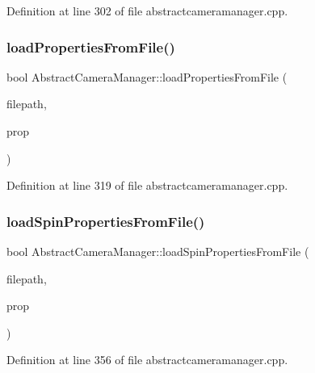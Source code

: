Definition at line 302 of file abstractcameramanager.\+cpp.

\mbox{\label{class_abstract_camera_manager_ae4c1fb8afd64ed6e843130ac9ccb90ce}} 
\subsubsection{\texorpdfstring{loadPropertiesFromFile()}{loadPropertiesFromFile()}}
{\footnotesize\ttfamily bool Abstract\+Camera\+Manager\+::load\+Properties\+From\+File (\begin{DoxyParamCaption}\item[{Q\+String \&}]{filepath,  }\item[{std\+::vector$<$ \mbox{\hyperlink{class_camera_manager_1_1_camera_property}{Camera\+Property}} $>$ \&}]{prop }\end{DoxyParamCaption})}



Definition at line 319 of file abstractcameramanager.\+cpp.

\mbox{\label{class_abstract_camera_manager_aaa967ad7d97960c28f38dba3a08b824d}} 
\subsubsection{\texorpdfstring{loadSpinPropertiesFromFile()}{loadSpinPropertiesFromFile()}}
{\footnotesize\ttfamily bool Abstract\+Camera\+Manager\+::load\+Spin\+Properties\+From\+File (\begin{DoxyParamCaption}\item[{Q\+String \&}]{filepath,  }\item[{std\+::vector$<$ \mbox{\hyperlink{class_camera_manager_spin_1_1_spin_camera_property}{Spin\+Camera\+Property}} $>$ \&}]{prop }\end{DoxyParamCaption})}



Definition at line 356 of file abstractcameramanager.\+cpp.

